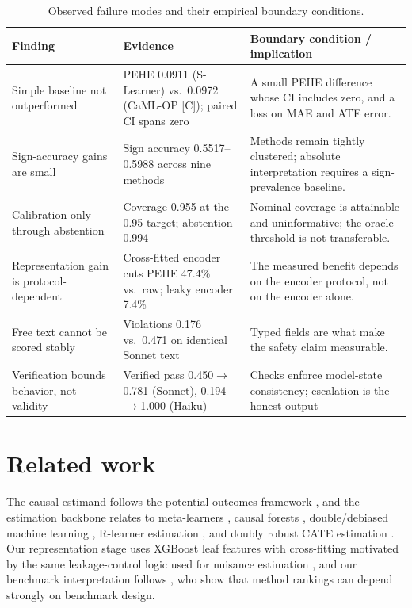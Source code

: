 \documentclass{article}
\begin{document}
\begin{table}[t]
\caption{Observed failure modes and their empirical boundary conditions.}
\label{tab:failure}
\centering\footnotesize
\setlength{\tabcolsep}{4pt}
\begin{tabular}{p{}p{}p{}}\toprule
Finding & Evidence & Boundary condition / implication\\\midrule
Simple baseline not outperformed & PEHE 0.0911 (S-Learner) vs.\ 0.0972 (CaML-OP [C]); paired CI spans zero & A small PEHE difference whose CI includes zero, and a loss on MAE and ATE error.\\
Sign-accuracy gains are small & Sign accuracy 0.5517--0.5988 across nine methods & Methods remain tightly clustered; absolute interpretation requires a sign-prevalence baseline.\\
Calibration only through abstention & Coverage 0.955 at the 0.95 target; abstention 0.994 & Nominal coverage is attainable and uninformative; the oracle threshold is not transferable.\\
Representation gain is protocol-dependent & Cross-fitted encoder cuts PEHE 47.4\% vs.\ raw; leaky encoder 7.4\% & The measured benefit depends on the encoder protocol, not on the encoder alone.\\
Free text cannot be scored stably & Violations 0.176 vs.\ 0.471 on identical Sonnet text & Typed fields are what make the safety claim measurable.\\
Verification bounds behavior, not validity & Verified pass 0.450$\rightarrow$0.781 (Sonnet), 0.194$\rightarrow$1.000 (Haiku) & Checks enforce model-state consistency; escalation is the honest output\\\bottomrule
\end{tabular}
\end{table}

\section{Related work}
The causal estimand follows the potential-outcomes framework \citep{imbens2015}, and the estimation backbone relates to meta-learners \citep{kunzel2019}, causal forests \citep{wager2018}, double/debiased machine learning \citep{chernozhukov2018}, R-learner estimation \citep{nie2021}, and doubly robust CATE estimation \citep{kennedy2023}. Our representation stage uses XGBoost leaf features \citep{chen2016} with cross-fitting motivated by the same leakage-control logic used for nuisance estimation \citep{chernozhukov2018}, and our benchmark interpretation follows \citet{curth2021}, who show that method rankings can depend strongly on benchmark design.
\end{document}
